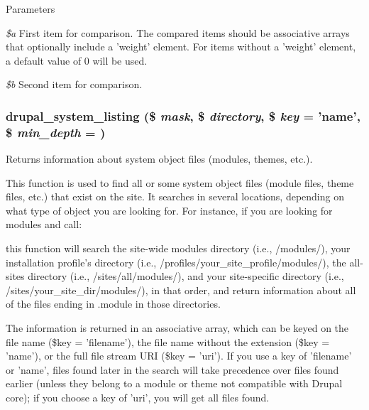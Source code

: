 \begin{DoxyParams}{Parameters}
\item[{\em \$a}]First item for comparison. The compared items should be associative arrays that optionally include a 'weight' element. For items without a 'weight' element, a default value of 0 will be used. \item[{\em \$b}]Second item for comparison. \end{DoxyParams}
\hypertarget{common_8inc_a60d1237b23d4e84a59656003596add4b}{
\subsubsection[{drupal\_\-system\_\-listing}]{\setlength{\rightskip}{0pt plus 5cm}drupal\_\-system\_\-listing (\$ {\em mask}, \/  \$ {\em directory}, \/  \$ {\em key} = {\ttfamily 'name'}, \/  \$ {\em min\_\-depth} = {})}}
\label{common_8inc_a60d1237b23d4e84a59656003596add4b}
Returns information about system object files (modules, themes, etc.).

This function is used to find all or some system object files (module files, theme files, etc.) that exist on the site. It searches in several locations, depending on what type of object you are looking for. For instance, if you are looking for modules and call: 
 this function will search the site-\/wide modules directory (i.e., /modules/), your installation profile's directory (i.e., /profiles/your\_\-site\_\-profile/modules/), the all-\/sites directory (i.e., /sites/all/modules/), and your site-\/specific directory (i.e., /sites/your\_\-site\_\-dir/modules/), in that order, and return information about all of the files ending in .module in those directories.

The information is returned in an associative array, which can be keyed on the file name (\$key = 'filename'), the file name without the extension (\$key = 'name'), or the full file stream URI (\$key = 'uri'). If you use a key of 'filename' or 'name', files found later in the search will take precedence over files found earlier (unless they belong to a module or theme not compatible with Drupal core); if you choose a key of 'uri', you will get all files found.


